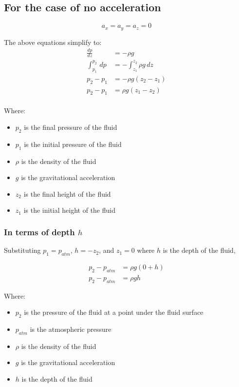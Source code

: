 \documentclass[11pt]{article}
\begin{document}
\subsection{For the case of no acceleration}
\label{sec:org21827c2}
\[a_x = a_y = a_z = 0\]

The above equations simplify to:
\begin{align*}
\frac{dp}{dz} &= - \rho g \\
\int_{p_1}^{p_2} \, dp &= - \int_{z_1}^{z_2} \rho g \, dz \\
p_2 - p_1 &= - \rho g (z_2 - z_1) \\
p_2 - p_1 &= \rho g (z_1 - z_2) \\
\end{align*}

Where:
\begin{itemize}
\item \(p_2\) is the final pressure of the fluid
\item \(p_1\) is the initial pressure of the fluid
\item \(\rho\) is the density of the fluid
\item \(g\) is the gravitational acceleration
\item \(z_2\) is the final height of the fluid
\item \(z_1\) is the initial height of the fluid
\end{itemize}

\subsubsection{In terms of depth \(h\)}
\label{sec:org8a6fecb}
Substituting \(p_1 = p_{atm}\), \(h = - z_2\), and \(z_1 = 0\) where \(h\) is the depth of the fluid,

\begin{align*}
p_2 - p_{atm} &= \rho g (0 + h) \\
p_2 - p_{atm} &= \rho g h
\end{align*}

Where:
\begin{itemize}
\item \(p_2\) is the pressure of the fluid at a point under the fluid surface
\item \(p_{atm}\) is the atmospheric pressure
\item \(\rho\) is the density of the fluid
\item \(g\) is the gravitational acceleration
\item \(h\) is the depth of the fluid
\end{itemize}
\end{document}
